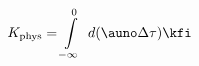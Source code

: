 \begin{equation}
K_{\rm phys}=\int\limits_{-\infty}^{0}~d(\auno \Delta\tau) \kfi
\label{intalpha}
\end{equation}

